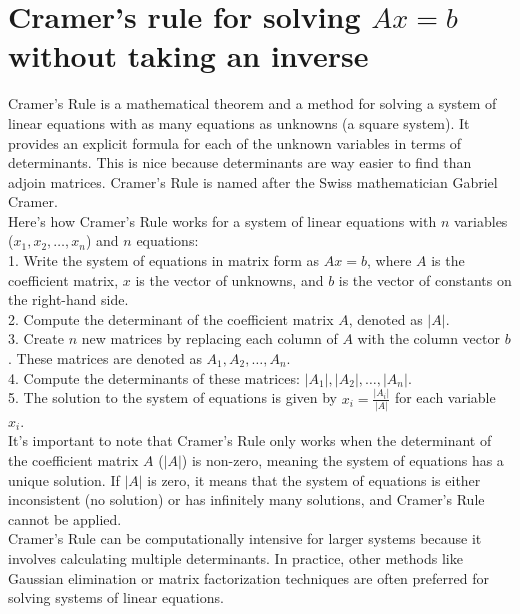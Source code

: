 \documentclass{article}
\begin{document}
\section{Cramer's rule for solving $Ax = b$ without taking an inverse}

Cramer's Rule is a mathematical theorem and a method for solving a system of linear equations with as many equations as unknowns (a square system). It provides an explicit formula for each of the unknown variables in terms of determinants. This is nice because determinants are way easier to find than adjoin matrices.  Cramer's Rule is named after the Swiss mathematician Gabriel Cramer.\\

Here's how Cramer's Rule works for a system of linear equations with $n$ variables ($x_1, x_2, \ldots, x_n$) and $n$ equations:\\

1. Write the system of equations in matrix form as $Ax = b$, where $A$ is the coefficient matrix, $x$ is the vector of unknowns, and $b$ is the vector of constants on the right-hand side.\\

2. Compute the determinant of the coefficient matrix $A$, denoted as $|A|$.\\

3. Create $n$ new matrices by replacing each column of $A$ with the column vector $b$. These matrices are denoted as $A_1, A_2, \ldots, A_n$.\\

4. Compute the determinants of these matrices: $|A_1|, |A_2|, \ldots, |A_n|$.\\

5. The solution to the system of equations is given by $x_i = \frac{|A_i|}{|A|}$ for each variable $x_i$.\\

It's important to note that Cramer's Rule only works when the determinant of the coefficient matrix $A$ ($|A|$) is non-zero, meaning the system of equations has a unique solution. If $|A|$ is zero, it means that the system of equations is either inconsistent (no solution) or has infinitely many solutions, and Cramer's Rule cannot be applied.\\

Cramer's Rule can be computationally intensive for larger systems because it involves calculating multiple determinants. In practice, other methods like Gaussian elimination or matrix factorization techniques are often preferred for solving systems of linear equations.\\
\end{document}
